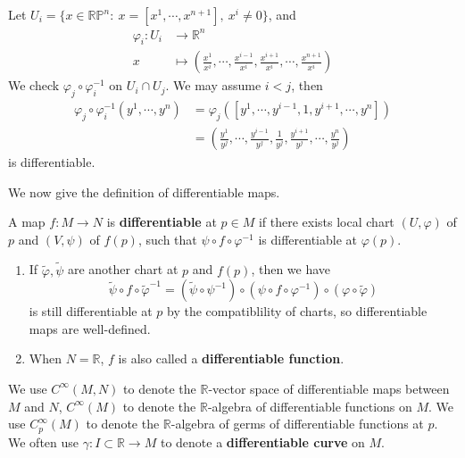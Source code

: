 \begin{eg}
\begin{enumerate}[(1)]
        Let $U_i=\{x\in\mathbb{RP}^n:\ x=[x^1,\cdots,x^{n+1}],\ x^i\neq 0\}$, and
        \begin{align*}
            \varphi_i:U_i&\to\mathbb{R}^n\\
            x&\mapsto\left(\frac{x^1}{x^i},\cdots,\frac{x^{i-1}}{x^i},\frac{x^{i+1}}{x^i},\cdots,\frac{x^{n+1}}{x^i}\right)
        \end{align*}
        We check $\varphi_j\circ\varphi_i^{-1}$ on $U_i\cap U_j$.
        We may assume $i<j$, then
        \begin{align*}
            \varphi_j\circ\varphi_i^{-1}(y^1,\cdots,y^n)&=\varphi_j\left([y^1,\cdots,y^{i-1},1,y^{i+1},\cdots,y^n]\right)\\
            &=\left(\frac{y^1}{y^j},\cdots,\frac{y^{i-1}}{y^j},\frac{1}{y^j},\frac{y^{i+1}}{y^j},\cdots,\frac{y^n}{y^j}\right)
        \end{align*}
        is differentiable.
    \end{enumerate}
\end{eg}

We now give the definition of differentiable maps.
\begin{defn}
    A map $f:M\to N$ is \textbf{differentiable} at $p\in M$ if there exists local chart $(U,\varphi)$ of $p$ and $(V,\psi)$ of $f(p)$, such that $\psi\circ f\circ\varphi^{-1}$ is differentiable at $\varphi(p)$.
\end{defn}

\begin{rem}
    \begin{enumerate}[(1)]
        \item If $\tilde{\varphi},\tilde{\psi}$ are another chart at $p$ and $f(p)$, then we have
        \[\tilde{\psi}\circ f\circ\tilde{\varphi}^{-1}=(\tilde{\psi}\circ\psi^{-1})\circ(\psi\circ f\circ\varphi^{-1})\circ(\varphi\circ\tilde{\varphi})\]
        is still differentiable at $p$ by the compatiblility of charts, so differentiable maps are well-defined.
        \item When $N=\mathbb{R}$, $f$ is also called a \textbf{differentiable function}. 
    \end{enumerate}
\end{rem}

\begin{symb}
    We use $C^\infty(M,N)$ to denote the $\mathbb{R}$-vector space of differentiable maps between $M$ and $N$,
    $C^\infty(M)$ to denote the $\mathbb{R}$-algebra of differentiable functions on $M$.
    We use $C^\infty_p(M)$ to denote the $\mathbb{R}$-algebra of germs of differentiable functions at $p$.
    We often use $\gamma:I\subset\mathbb{R}\to M$ to denote a \textbf{differentiable curve} on $M$.
\end{symb}

